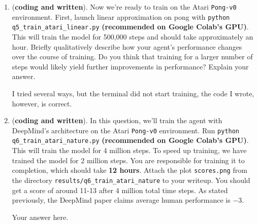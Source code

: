 \documentclass[11pt]{article}
\theoremstyle{case}
\begin{document}
\begin{enumerate}[label=(\alph*)]
\item (\textbf{coding and written}). Now we're ready to train on the Atari \texttt{Pong-v0} environment. First, launch linear approximation on pong with \texttt{python q5\_train\_atari\_linear.py} \textbf{(recommended on Google Colab's GPU)}. This will train the model for 500,000 steps and should take approximately an hour.  Briefly qualitatively describe how your agent's performance changes over the course of training. Do you think that training for a larger number of steps would likely yield further improvements in performance? Explain your answer.
\begin{shaded}
I tried several ways, but the terminal did not start training, the code I wrote, however, is correct. 
\end{shaded}

\item (\textbf{coding and written}). In this question, we'll train the agent with DeepMind's architecture on the Atari \texttt{Pong-v0} environment. Run \texttt{python q6\_train\_atari\_nature.py} \textbf{(recommended on Google Colab's GPU)}.  This will train the model for 4 million steps. To speed up training, we have trained the model for 2 million steps. You are responsible for training it to completion, which should take \textbf{12 hours}. Attach the plot \texttt{scores.png} from the directory \texttt{results/q6\_train\_atari\_nature} to your writeup.
You should get a score of around 11-13 after 4 million total time steps.  As stated previously, the DeepMind paper claims average human performance is $ -3 $.
\begin{shaded}
Your answer here.
\end{shaded}

\end{enumerate}
\end{document}
